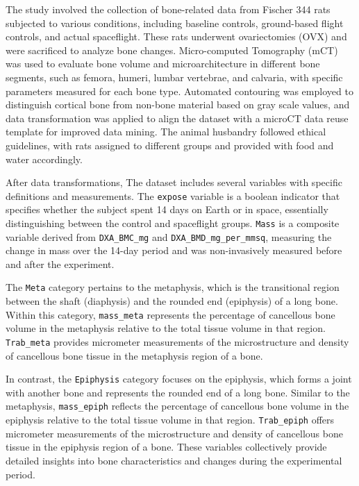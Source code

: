 \documentclass{article}
\begin{document}
The study involved the collection of bone-related data from Fischer 344 rats subjected to various conditions, including baseline controls, ground-based flight controls, and actual spaceflight. These rats underwent ovariectomies (OVX) and were sacrificed to analyze bone changes. Micro-computed Tomography (mCT) was used to evaluate bone volume and microarchitecture in different bone segments, such as femora, humeri, lumbar vertebrae, and calvaria, with specific parameters measured for each bone type. Automated contouring was employed to distinguish cortical bone from non-bone material based on gray scale values, and data transformation was applied to align the dataset with a microCT data reuse template for improved data mining. The animal husbandry followed ethical guidelines, with rats assigned to different groups and provided with food and water accordingly.

After data transformations, The dataset includes several variables with specific definitions and measurements. The \texttt{expose} variable is a boolean indicator that specifies whether the subject spent 14 days on Earth or in space, essentially distinguishing between the control and spaceflight groups. \texttt{Mass} is a composite variable derived from \texttt{DXA\_BMC\_mg} and \texttt{DXA\_BMD\_mg\_per\_mmsq}, measuring the change in mass over the 14-day period and was non-invasively measured before and after the experiment.

The \texttt{Meta} category pertains to the metaphysis, which is the transitional region between the shaft (diaphysis) and the rounded end (epiphysis) of a long bone. Within this category, \texttt{mass\_meta} represents the percentage of cancellous bone volume in the metaphysis relative to the total tissue volume in that region. \texttt{Trab\_meta} provides micrometer measurements of the microstructure and density of cancellous bone tissue in the metaphysis region of a bone.

In contrast, the \texttt{Epiphysis} category focuses on the epiphysis, which forms a joint with another bone and represents the rounded end of a long bone. Similar to the metaphysis, \texttt{mass\_epiph} reflects the percentage of cancellous bone volume in the epiphysis relative to the total tissue volume in that region. \texttt{Trab\_epiph} offers micrometer measurements of the microstructure and density of cancellous bone tissue in the epiphysis region of a bone. These variables collectively provide detailed insights into bone characteristics and changes during the experimental period.
\end{document}
